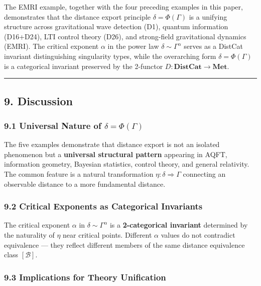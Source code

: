 \documentclass[
]{article}
\begin{document}
The EMRI example, together with the four preceding examples in this paper, demonstrates that the distance export principle $\delta = \Phi(\Gamma)$ is a unifying structure across gravitational wave detection (D1), quantum information (D16+D24), LTI control theory (D26), and strong-field gravitational dynamics (EMRI). The critical exponent $\alpha$ in the power law $\delta \sim \Gamma^\alpha$ serves as a DistCat invariant distinguishing singularity types, while the overarching form $\delta = \Phi(\Gamma)$ is a categorical invariant preserved by the 2-functor $D: \mathbf{DistCat} \to \mathbf{Met}$.

\begin{center}\rule{0.5\linewidth}{0.5pt}\end{center}


\subsection{9. Discussion}\label{discussion}

\subsubsection{\texorpdfstring{9.1 Universal Nature of
\(\delta = \Phi(\Gamma)\)}{9.1 Universal Nature of \textbackslash delta = \textbackslash Phi(\textbackslash Gamma)}}\label{universal-nature-of-delta-phigamma}

The five examples demonstrate that distance export is not an isolated
phenomenon but a \textbf{universal structural pattern} appearing in
AQFT, information geometry, Bayesian statistics, control theory, and
general relativity. The common feature is a natural transformation
\(\eta: \delta \Rightarrow \Gamma\) connecting an observable distance to
a more fundamental distance.

\subsubsection{9.2 Critical Exponents as Categorical
Invariants}\label{critical-exponents-as-categorical-invariants}

The critical exponent \(\alpha\) in \(\delta \sim \Gamma^\alpha\) is a
\textbf{2-categorical invariant} determined by the naturality of
\(\eta\) near critical points. Different \(\alpha\) values do not
contradict equivalence --- they reflect different members of the same
distance equivalence class \([\mathcal{B}]\).

\subsubsection{9.3 Implications for Theory
Unification}\label{implications-for-theory-unification}
\end{document}
